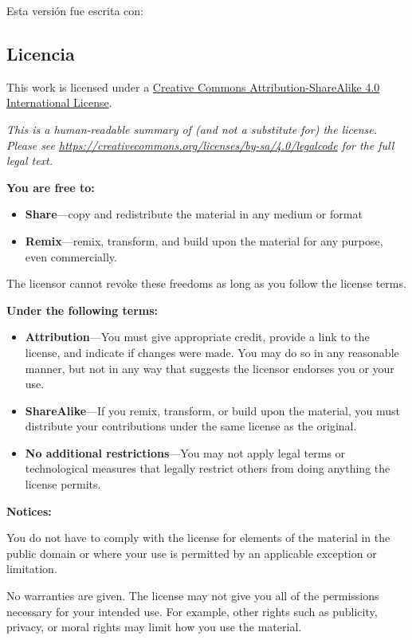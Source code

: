 \documentclass[
  a4paper,
  oneside,
  openany]{book}
\begin{document}
Esta versión fue escrita con:

\hypertarget{licencia}{%
\subsection*{Licencia}\label{licencia}}


This work is licensed under a \href{https://creativecommons.org/licenses/by-sa/4.0/}{Creative Commons Attribution-ShareAlike 4.0 International License}.

\emph{This is a human-readable summary of (and not a substitute for) the license.
Please see \url{https://creativecommons.org/licenses/by-sa/4.0/legalcode} for the full legal text.}

\textbf{You are free to:}

\begin{itemize}
\item
  \textbf{Share}---copy and redistribute the material in any medium or
  format
\item
  \textbf{Remix}---remix, transform, and build upon the material for any
  purpose, even commercially.
\end{itemize}

The licensor cannot revoke these freedoms as long as you follow the
license terms.

\textbf{Under the following terms:}

\begin{itemize}
\item
  \textbf{Attribution}---You must give appropriate credit, provide a link
  to the license, and indicate if changes were made. You may do so in
  any reasonable manner, but not in any way that suggests the licensor
  endorses you or your use.
\item
  \textbf{ShareAlike}---If you remix, transform, or build upon the material, you must distribute your contributions under the same license as the original.
\item
  \textbf{No additional restrictions}---You may not apply legal terms or
  technological measures that legally restrict others from doing
  anything the license permits.
\end{itemize}

\textbf{Notices:}

You do not have to comply with the license for elements of the
material in the public domain or where your use is permitted by an
applicable exception or limitation.

No warranties are given. The license may not give you all of the
permissions necessary for your intended use. For example, other rights
such as publicity, privacy, or moral rights may limit how you use the
material.
\end{document}

